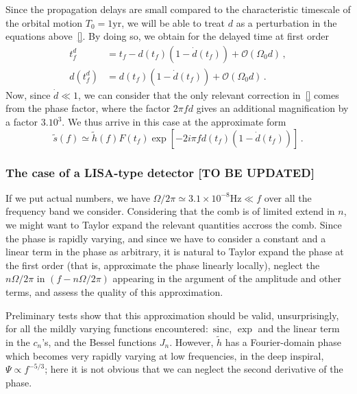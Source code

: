 \documentclass[aps,showpacs,%
prd,superscriptaddress,nofootinbib]{revtex4}
\newcommand{\be}{\begin{equation}}
\newcommand{\ee}{\end{equation}}
\newcommand\calO{{\mathcal{O}}}
\newcommand{\nn}{\nonumber}
\newcommand{\sinc}{\,\mathrm{sinc}}
\begin{document}
Since the propagation delays are small compared to the characteristic timescale of the orbital motion $T_{0} = 1\mathrm{yr}$, we will be able to treat $d$ as a perturbation in the equations above~\eqref{}. By doing so, we obtain for the delayed time at first order
\begin{align}
	t_{f}^{d} &= t_{f} - d(t_{f}) ( 1 - \dot{d}(t_{f})) + \calO(\Omega_{0}d) \,, \nn\\
	d(t_{f}^{d}) &= d(t_{f}) ( 1 - \dot{d}(t_{f})) + \calO(\Omega_{0}d) \,.
\end{align}
Now, since $\dot{d} \ll 1$, we can consider that the only relevant correction in~\eqref{} comes from the phase factor, where the factor $2\pi f d$ gives an additional magnification by a factor $3.10^{3}$. We thus arrive in this case at the approximate form
\be
	\tilde{s}(f) \simeq \tilde{h}(f) F(t_{f})\exp\left[ -2i\pi f d(t_{f}) (1-\dot{d}(t_{f})) \right] \,.
\ee   

\subsubsection{The case of a LISA-type detector [TO BE UPDATED]}
\label{subsubsec:sizecorrLISA}

If we put actual numbers, we have $\Omega/2\pi \simeq 3.1\times10^{-8}\mathrm{Hz} \ll f$ over all the frequency band we consider. Considering that the comb is of limited extend in $n$, we might want to Taylor expand the relevant quantities accross the comb. Since the phase is rapidly varying, and since we have to consider a constant and a linear term in the phase as arbitrary, it is natural to Taylor expand the phase at the first order (that is, approximate the phase linearly locally), neglect the $n\Omega/2\pi$ in $(f-n\Omega/2\pi)$ appearing in the argument of the amplitude and other terms, and assess the quality of this approximation.

Preliminary tests show that this approximation should be valid, unsurprisingly, for all the mildly varying functions encountered: $\sinc$, $\exp$ and the linear term in the $c_{n}$'s, and the Bessel functions $J_{n}$. However, $\tilde{h}$ has a Fourier-domain phase which becomes very rapidly varying at low frequencies, in the deep inspiral, $\Psi\propto f^{-5/3}$; here it is not obvious that we can neglect the second derivative of the phase.
\end{document}
